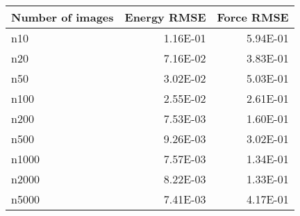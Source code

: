 \begin{tabular}{lrr}
\toprule
Number of images &  Energy RMSE &  Force RMSE \\
\midrule
             n10 &     1.16E-01 &    5.94E-01 \\
             n20 &     7.16E-02 &    3.83E-01 \\
             n50 &     3.02E-02 &    5.03E-01 \\
            n100 &     2.55E-02 &    2.61E-01 \\
            n200 &     7.53E-03 &    1.60E-01 \\
            n500 &     9.26E-03 &    3.02E-01 \\
           n1000 &     7.57E-03 &    1.34E-01 \\
           n2000 &     8.22E-03 &    1.33E-01 \\
           n5000 &     7.41E-03 &    4.17E-01 \\
\bottomrule
\end{tabular}
